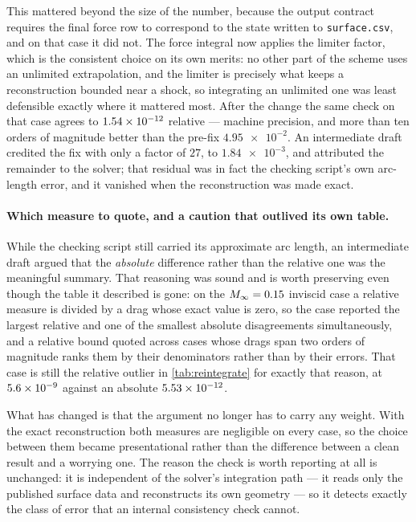 This mattered beyond the size of the number, because the output contract requires
the final force row to correspond to the state written to \texttt{surface.csv}, and
on that case it did not. The force integral now applies the limiter factor, which is
the consistent choice on its own merits: no other part of the scheme uses an
unlimited extrapolation, and the limiter is precisely what keeps a reconstruction
bounded near a shock, so integrating an unlimited one was least defensible exactly
where it mattered most. After the change the same check on that case agrees to
$\num{1.54e-12}$ relative --- machine precision, and more than ten orders of
magnitude better than the pre-fix $\num{4.95e-2}$. An intermediate draft credited the fix
with only a factor of $27$, to $\num{1.84e-3}$, and attributed the remainder to the
solver; that residual was in fact the checking script's own arc-length error, and it
vanished when the reconstruction was made exact.

\paragraph{Which measure to quote, and a caution that outlived its own table.} While the
checking script still carried its approximate arc length, an intermediate draft argued that
the \emph{absolute} difference rather than the relative one was the meaningful summary. That
reasoning was sound and is worth preserving even though the table it described is gone: on
the $M_\infty=0.15$ inviscid case a relative measure is divided by a drag whose exact value is
zero, so the case reported the largest relative and one of the smallest absolute
disagreements simultaneously, and a relative bound quoted across cases whose drags span two
orders of magnitude ranks them by their denominators rather than by their errors. That case
is still the relative outlier in \cref{tab:reintegrate} for exactly that reason, at
$\num{5.6e-09}$ against an absolute $\num{5.53e-12}$.

What has changed is that the argument no longer has to carry any weight. With the exact
reconstruction both measures are negligible on every case, so the choice between them became
presentational rather than the difference between a clean result and a worrying one. The
reason the check is worth reporting at all is unchanged: it is independent of the solver's
integration path --- it reads only the published surface data and reconstructs its own
geometry --- so it detects exactly the class of error that an internal consistency check
cannot.

